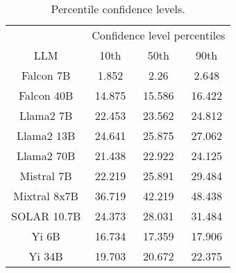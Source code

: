 \begin{table*}
\centering
\begin{tabular}{c|c|c|c}
& \multicolumn{3}{c}{Confidence level percentiles} \\ 
LLM & 10th & 50th & 90th\\ \hline
Falcon 7B & 1.852 & 2.26 & 2.648\\
Falcon 40B & 14.875 & 15.586 & 16.422\\
Llama2 7B & 22.453 & 23.562 & 24.812\\
Llama2 13B & 24.641 & 25.875 & 27.062\\
Llama2 70B & 21.438 & 22.922 & 24.125\\
Mistral 7B & 22.219 & 25.891 & 29.484\\
Mixtral 8x7B & 36.719 & 42.219 & 48.438\\
SOLAR 10.7B & 24.373 & 28.031 & 31.484\\
Yi 6B & 16.734 & 17.359 & 17.906\\
Yi 34B & 19.703 & 20.672 & 22.375\\
\hline
\end{tabular}
\caption{Percentile confidence levels.}
\label{tab:percentile_conf}
\end{table*}
